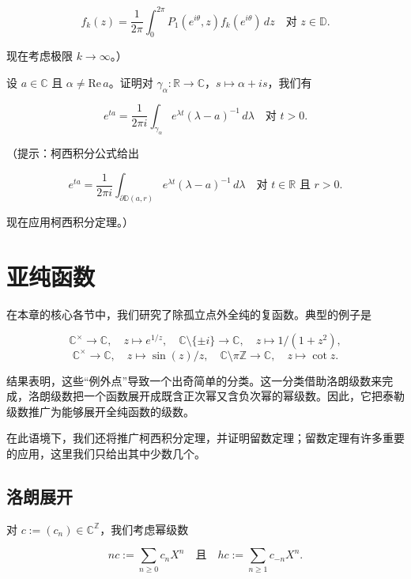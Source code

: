 \begin{exercises}
\begin{items}
\[
f_k(z) = \frac{1}{2\pi}\int_0^{2\pi} P_1(e^{i\theta}, z)f_k(e^{i\theta})\,dz \quad \text{对 } z \in \mathbb{D} .
\]

现在考虑极限 $ k \to \infty $。）

\end{items}

\item

设 $ a \in \mathbb{C} $ 且 $ \alpha \ne \mathrm{Re}\,a $。证明对 $ \gamma_\alpha : \mathbb{R} \to \mathbb{C} $，$ s \mapsto \alpha + is $，我们有

\[
e^{ta} = \frac{1}{2\pi i}\int_{\gamma_\alpha} e^{\lambda t}(\lambda - a)^{-1}\,d\lambda \quad \text{对 } t > 0 .
\]

（提示：柯西积分公式给出

\[
e^{ta} = \frac{1}{2\pi i}\int_{\partial\mathbb{D}(a,r)} e^{\lambda t}(\lambda - a)^{-1}\,d\lambda \quad \text{对 } t \in \mathbb{R} \text{ 且 } r > 0 .
\]

现在应用柯西积分定理。）

\end{exercises}

\section{亚纯函数}

在本章的核心各节中，我们研究了除孤立点外全纯的复函数。典型的例子是

\[
\mathbb{C}^{\times} \to \mathbb{C} , \quad z \mapsto e^{1/z} , \quad \mathbb{C}\setminus\{\pm i\} \to \mathbb{C} , \quad z \mapsto 1/(1 + z^{2}) ,
\]
\[
\mathbb{C}^{\times} \to \mathbb{C} , \quad z \mapsto \sin(z)/z , \quad \mathbb{C}\setminus\pi\mathbb{Z} \to \mathbb{C} , \quad z \mapsto \cot z .
\]

结果表明，这些“例外点”导致一个出奇简单的分类。这一分类借助洛朗级数来完成，洛朗级数把一个函数展开成既含正次幂又含负次幂的幂级数。因此，它把泰勒级数推广为能够展开全纯函数的级数。

在此语境下，我们还将推广柯西积分定理，并证明留数定理；留数定理有许多重要的应用，这里我们只给出其中少数几个。

\subsection*{洛朗展开}

对 $ c := (c_{n}) \in \mathbb{C}^{\mathbb{Z}} $，我们考虑幂级数

\[
nc := \sum_{n\ge 0} c_{n}X^{n} \quad\text{且}\quad hc := \sum_{n\ge 1} c_{-n}X^{n} .
\]

